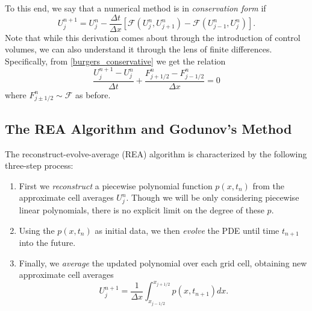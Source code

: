 \documentclass{myproject}
\begin{document}
To this end, we say that a numerical method is in \emph{conservation form} if 
\begin{equation}\label{conservation_form}
    U_j^{n+1} = U_j^n - \frac{\Delta t}{\Delta x} \left[ \mathcal{F}(U_{j}^{n}, U_{j+1}^{n}) - \mathcal{F}(U_{j-1}^{n}, U_{j}^{n}) \right].
\end{equation}
Note that while this derivation comes about through the introduction of control volumes, we can also understand it through the lens of finite differences. Specifically, from \eqref{burgers_conservative} we get the relation
\begin{equation}
    \frac{U_j^{n+1} - U_j^n}{\Delta t} + \frac{F_{j+1/2}^n - F_{j-1/2}^n}{\Delta x} = 0
\end{equation}
where $F_{j\pm1/2}^n \sim \mathcal{F}$ as before.

\subsection{The REA Algorithm and Godunov's Method}

The reconstruct-evolve-average (REA) algorithm is characterized by the following three-step process:
\begin{enumerate}
    \item
    First we \emph{reconstruct} a piecewise polynomial function $p(x,t_n)$ from the approximate cell averages $U_j^n$. Though we will be only considering piecewise linear polynomials, there is no explicit limit on the degree of these $p$.

    \item
    Using the $p(x,t_n)$ as initial data, we then \emph{evolve} the PDE until time $t_{n+1}$ into the future.

    \item
    Finally, we \emph{average} the updated polynomial over each grid cell, obtaining new approximate cell averages
    \begin{equation}
        U_j^{n+1} = \frac{1}{\Delta x} \int_{x_{j-1/2}}^{x_{j+1/2}} p(x,t_{n+1}) dx.
    \end{equation}
\end{enumerate}
\end{document}
